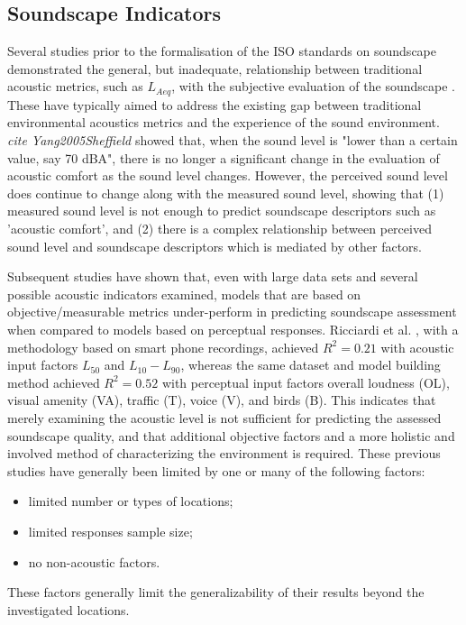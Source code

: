   \subsection{Soundscape Indicators}
    Several studies prior to the formalisation of the ISO standards on soundscape demonstrated the general, but inadequate, relationship between traditional acoustic metrics, such as $L_{Aeq}$, with the subjective evaluation of the soundscape \cite{Berglund2006Tool, Yang2005Comfort,  Aumond2017Modeling, AlsinaPages2020Perceptual}.
    These have typically aimed to address the existing gap between traditional environmental acoustics metrics and the experience of the sound environment. \emph{cite Yang2005Sheffield} showed that, when the sound level is "lower than a certain value, say 70 dBA", there is no longer a significant change in the evaluation of acoustic comfort as the sound level changes. However, the perceived sound level does continue to change along with the measured sound level, showing that (1) measured sound level is not enough to predict soundscape descriptors such as 'acoustic comfort', and (2) there is a complex relationship between perceived sound level and soundscape descriptors which is mediated by other factors.

    Subsequent studies have shown that, even with large data sets and several possible acoustic indicators examined, models that are based on objective/measurable metrics under-perform in predicting soundscape assessment when compared to models based on perceptual responses. Ricciardi et al. \cite{Ricciardi2015Sound}, with a methodology based on smart phone recordings, achieved $R^2 = 0.21$ with acoustic input factors $L_50$ and $L_10-L_90$, whereas the same dataset and model building method achieved $R^2 = 0.52$ with perceptual input factors overall loudness (OL), visual amenity (VA), traffic (T), voice (V), and birds (B). This indicates that merely examining the acoustic level is not sufficient for predicting the assessed soundscape quality, and that additional objective factors and a more holistic and involved method of characterizing the environment is required. These previous studies have generally been limited by one or many of the following factors:
    \begin{itemize}
      \item limited number or types of locations;
      \item limited responses sample size;
      \item no non-acoustic factors.
    \end{itemize}
    These factors generally limit the generalizability of their results beyond the investigated locations.

